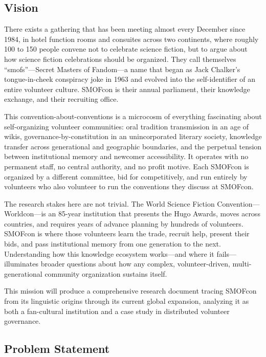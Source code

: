 \documentclass[11pt,letterpaper]{article}
\begin{document}
\subsection{Vision}

There exists a gathering that has been meeting almost every December since 1984, in hotel function rooms and consuites across two continents, where roughly 100 to 150 people convene not to celebrate science fiction, but to argue about how science fiction celebrations should be organized. They call themselves ``smofs''---Secret Masters of Fandom---a name that began as Jack Chalker's tongue-in-cheek conspiracy joke in 1963 and evolved into the self-identifier of an entire volunteer culture. SMOFcon is their annual parliament, their knowledge exchange, and their recruiting office.

This convention-about-conventions is a microcosm of everything fascinating about self-organizing volunteer communities: oral tradition transmission in an age of wikis, governance-by-constitution in an unincorporated literary society, knowledge transfer across generational and geographic boundaries, and the perpetual tension between institutional memory and newcomer accessibility. It operates with no permanent staff, no central authority, and no profit motive. Each SMOFcon is organized by a different committee, bid for competitively, and run entirely by volunteers who also volunteer to run the conventions they discuss at SMOFcon.

The research stakes here are not trivial. The World Science Fiction Convention---Worldcon---is an 85-year institution that presents the Hugo Awards, moves across countries, and requires years of advance planning by hundreds of volunteers. SMOFcon is where those volunteers learn the trade, recruit help, present their bids, and pass institutional memory from one generation to the next. Understanding how this knowledge ecosystem works---and where it fails---illuminates broader questions about how any complex, volunteer-driven, multi-generational community organization sustains itself.

This mission will produce a comprehensive research document tracing SMOFcon from its linguistic origins through its current global expansion, analyzing it as both a fan-cultural institution and a case study in distributed volunteer governance.

\subsection{Problem Statement}
\end{document}
